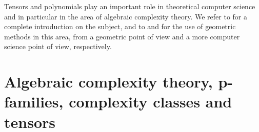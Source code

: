 Tensors and polynomials play an important role in theoretical computer science and in particular in the area of algebraic complexity theory. We refer to \cite{BCS97} for a complete introduction on the subject, and to \cite{Lan17} and \cite{BI18} for the use of geometric methods in this area, from a geometric point of view and a more computer science point of view, respectively.


\chapter{Algebraic complexity theory, p-families, complexity classes and tensors}
\label{complexitytheory-chapter-ACTintro}


